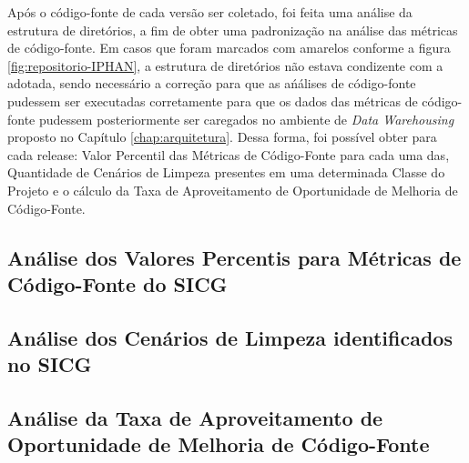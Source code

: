 Após o código-fonte de cada versão ser coletado, foi feita uma análise da estrutura de diretórios, a fim de obter uma padronização na análise das métricas de código-fonte. Em casos que foram marcados com amarelos conforme a figura \ref{fig:repositorio-IPHAN}, a estrutura de diretórios não estava condizente com a adotada, sendo necessário a correção para que as ańálises de código-fonte pudessem ser executadas corretamente para que os dados das métricas de código-fonte pudessem posteriormente ser caregados no ambiente de \textit{Data Warehousing} proposto no Capítulo \ref{chap:arquitetura}. Dessa forma, foi possível obter para cada release: Valor Percentil das Métricas de Código-Fonte para cada uma das, Quantidade de Cenários de Limpeza presentes em uma determinada Classe do Projeto e o cálculo da Taxa de Aproveitamento de Oportunidade de Melhoria de Código-Fonte. 


\subsection{Análise dos Valores Percentis para Métricas de Código-Fonte do SICG}


\subsection{Análise dos Cenários de Limpeza identificados no SICG}

\subsection{Análise da Taxa de Aproveitamento de Oportunidade de Melhoria de Código-Fonte}

